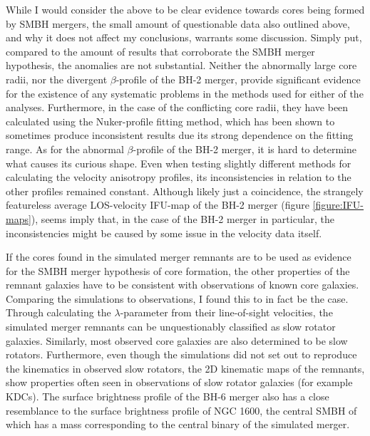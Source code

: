 \documentclass[english, twoside]{HYgradu}
\begin{document}
While I would consider the above to be clear evidence towards cores being formed by SMBH mergers, the small amount of questionable data also outlined above, and why it does not affect my conclusions, warrants some discussion. Simply put, compared to the amount of results that corroborate the SMBH merger hypothesis, the anomalies are not substantial. Neither the abnormally large core radii, nor the divergent $\beta$-profile of the BH-2 merger, provide significant evidence for the existence of any systematic problems in the methods used for either of the analyses. Furthermore, in the case of the conflicting core radii, they have been calculated using the Nuker-profile fitting method, which has been shown to sometimes produce inconsistent results due its strong dependence on the fitting range. As for the abnormal $\beta$-profile of the BH-2 merger, it is hard to determine what causes its curious shape. Even when testing slightly different methods for calculating the velocity anisotropy profiles, its inconsistencies in relation to the other profiles remained constant. Although likely just a coincidence, the strangely featureless average LOS-velocity IFU-map of the BH-2 merger (figure \ref{figure:IFU-maps}), seems imply that, in the case of the BH-2 merger in particular, the inconsistencies might be caused by some issue in the velocity data itself.  

If the cores found in the simulated merger remnants are to be used as evidence for the SMBH merger hypothesis of core formation, the other properties of the remnant galaxies have to be consistent with observations of known core galaxies. Comparing the simulations to observations, I found this to in fact be the case. Through calculating the $\lambda$-parameter from their line-of-sight velocities, the simulated merger remnants can be unquestionably classified as slow rotator galaxies. Similarly, most observed core galaxies are also determined to be slow rotators. Furthermore, even though the simulations did not set out to reproduce the kinematics in observed slow rotators, the 2D kinematic maps of the remnants, show properties often seen in observations of slow rotator galaxies (for example KDCs). The surface brightness profile of the BH-6 merger also has a close resemblance to the surface brightness profile of NGC 1600, the central SMBH of which has a mass corresponding to the central binary of the simulated merger. 
\end{document}

